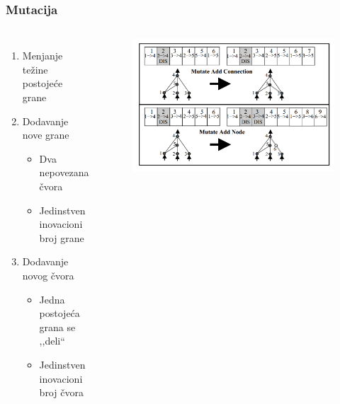 \documentclass{beamer}
\begin{document}
\begin{frame} 
\frametitle{Mutacija}
\begin{columns}[c]
\begin{enumerate}
\item Menjanje težine postojeće grane
\item Dodavanje nove grane
\begin{itemize}
\item Dva nepovezana čvora
\item Jedinstven inovacioni broj grane
\end{itemize}
\item Dodavanje novog čvora
\begin{itemize}
\item Jedna postojeća grana se ,,deli``
\item Jedinstven inovacioni broj čvora
\end{itemize}
\end{enumerate}

\begin{figure}
\includegraphics[width=1\linewidth]{images/mutation.png}
\end{figure}
\end{columns}

\end{frame}
\end{document}
